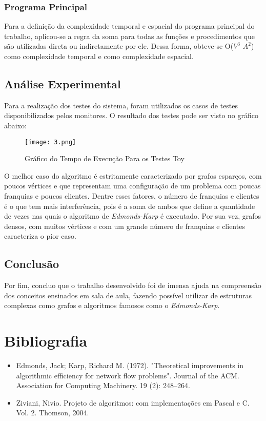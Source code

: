 \documentclass[
    12pt,               %
    a4paper,            %
    oneside,
    english,            %
    french,             %
    spanish,            %
    brazil              %
    ]{abntex2}
\begin{document}
\subsection*{Programa Principal}

	Para a definição da complexidade temporal e espacial do programa principal do trabalho, aplicou-se a regra da soma para todas as funções e procedimentos que são utilizadas direta ou indiretamente por ele. Dessa forma, obteve-se O($V^3$ $A^2$) como complexidade temporal e como complexidade espacial.

\section*{Análise Experimental}

	Para a realização dos testes do sistema, foram utilizados os casos de testes disponibilizados pelos monitores. O resultado dos testes pode ser visto no gráfico abaixo:
	
	\begin{figure}[!htb]
\centering
\texttt{[image: 3.png]}
\caption{Gráfico do Tempo de Execução Para os Testes Toy}
\end{figure}

	O melhor caso do algoritmo é estritamente caracterizado por grafos esparços, com poucos vértices e que representam uma configuração de um problema com poucas franquias e poucos clientes. Dentre esses fatores, o número de franquias e clientes é o que tem mais interferência, pois é a soma de ambos que define a quantidade de vezes nas quais o algoritmo de \textit{Edmonds-Karp} é executado. Por sua vez, grafos densos, com muitos vértices e com um grande número de franquias e clientes caracteriza o pior caso.
	
\section*{Conclusão}

	Por fim, concluo que o trabalho desenvolvido foi de imensa ajuda na
compreensão dos conceitos ensinados em sala de aula, fazendo possível utilizar de
estruturas complexas como grafos e algoritmos famosos como o \textit{Edmonds-Karp}.

\chapter*{Bibliografia}

\begin{itemize}
\item Edmonds, Jack; Karp, Richard M. (1972). "Theoretical improvements in algorithmic efficiency for network flow problems". Journal of the ACM. Association for Computing Machinery. 19 (2): 248–264.
\item Ziviani, Nivio. Projeto de algoritmos: com implementações em Pascal e C. Vol. 2.
Thomson, 2004.
\end{itemize}
\end{document}
